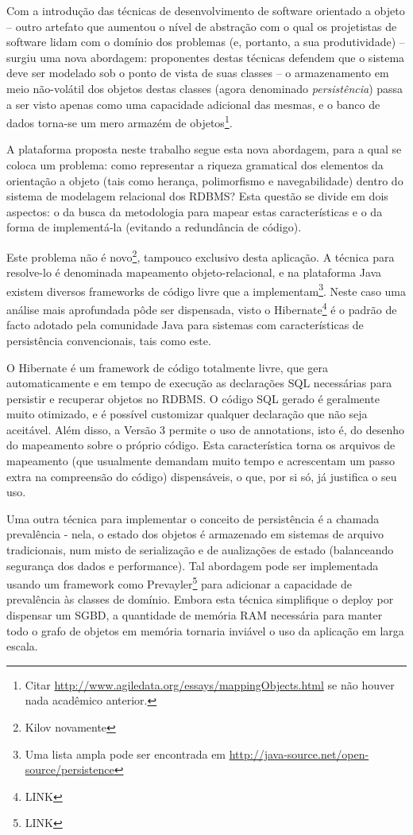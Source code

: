 \documentclass[11pt]{book}
\begin{document}
Com a introdução das técnicas de desenvolvimento de software orientado a objeto – outro artefato que aumentou o nível de abstração com o qual os projetistas de software lidam com o domínio dos problemas (e, portanto, a sua produtividade) – surgiu uma nova abordagem: proponentes destas técnicas defendem que o sistema deve ser modelado sob o ponto de vista de suas classes – o armazenamento em meio não-volátil dos objetos destas classes (agora denominado \textit{persistência}) passa a ser visto apenas como uma capacidade adicional das mesmas, e o banco de dados torna-se um mero armazém de objetos\footnote{Citar \url{http://www.agiledata.org/essays/mappingObjects.html} se não houver nada acadêmico anterior.}.

A plataforma proposta neste trabalho segue esta nova abordagem, para a qual se coloca um problema: como representar a riqueza gramatical dos elementos da orientação a objeto (tais como herança, polimorfismo e navegabilidade) dentro do sistema de modelagem relacional dos RDBMS? Esta questão se divide em dois aspectos: o da busca da metodologia para mapear estas características e o da forma de implementá-la (evitando a redundância de código).

Este problema não é novo\footnote{Kilov novamente}, tampouco exclusivo desta aplicação. A técnica para resolve-lo é denominada mapeamento objeto-relacional, e na plataforma Java existem diversos frameworks de código livre que a implementam\footnote{Uma lista ampla pode ser encontrada em \url{http://java-source.net/open-source/persistence}}. Neste caso uma análise mais aprofundada pôde ser dispensada, visto o Hibernate\footnote{LINK} é o padrão de facto adotado pela comunidade Java para sistemas com características de persistência convencionais, tais como este.

O Hibernate é um framework de código totalmente livre, que gera automaticamente e em tempo de execução as declarações SQL necessárias para persistir e recuperar objetos no RDBMS. O código SQL gerado é geralmente muito otimizado, e é possível customizar qualquer declaração que não seja aceitável. Além disso, a Versão 3 permite o uso de annotations, isto é, do desenho do mapeamento sobre o próprio código. Esta característica torna os arquivos de mapeamento (que usualmente demandam muito tempo e acrescentam um passo extra na compreensão do código) dispensáveis, o que, por si só, já justifica o seu uso.

Uma outra técnica para implementar o conceito de persistência é a chamada prevalência - nela, o estado dos objetos é armazenado em sistemas de arquivo tradicionais, num misto de serialização e de aualizações de estado (balanceando segurança dos dados e performance). Tal abordagem pode ser implementada usando um framework como Prevayler\footnote{LINK} para adicionar a capacidade de prevalência às classes de domínio. Embora esta técnica simplifique o deploy por dispensar um SGBD, a quantidade de memória RAM necessária para manter todo o grafo de objetos em memória tornaria inviável o uso da aplicação em larga escala.
\end{document}
